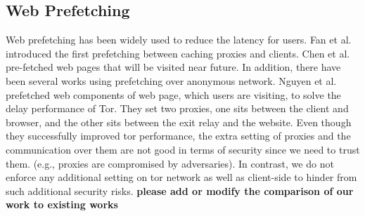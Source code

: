\subsection{Web Prefetching}
Web prefetching has been widely used to reduce the latency for users. Fan et al.\cite{Fan1999} introduced the first prefetching between caching proxies and clients. Chen et al. \cite{Chen2003} pre-fetched web pages that will be visited near future. In addition, there have been several works using prefetching over anonymous network. Nguyen et al. \cite{} prefetched web components of web page, which users are visiting, to solve the delay performance of Tor. They set two proxies, one sits between the client and browser, and the other sits between the exit relay and the website. Even though they successfully improved tor performance, the extra setting of proxies and the communication over them are not good in terms of security since we need to trust them. (e.g., proxies are compromised by adversaries). In contrast, we do not enforce any additional setting on tor network as well as client-side to hinder from such additional security risks.  \textbf{please add  or modify the comparison of our work to existing works}


